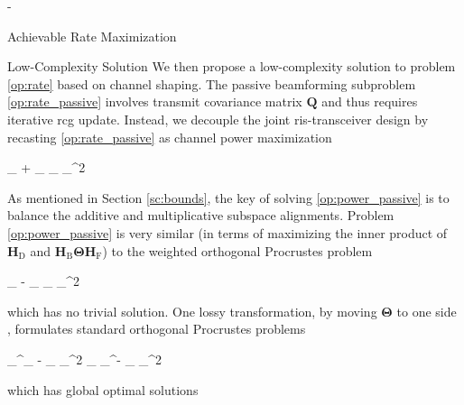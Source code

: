\begin{section}{-}
\begin{subsection}{Achievable Rate Maximization}
		\begin{subsubsection}{Low-Complexity Solution}\label{sc:low_complexity}
			We then propose a low-complexity solution to problem \eqref{op:rate} based on channel shaping.
			The passive beamforming subproblem \eqref{op:rate_passive} involves transmit covariance matrix $\mathbf{Q}$ and thus requires iterative \gls{rcg} update.
			Instead, we decouple the joint \gls{ris}-transceiver design by recasting \eqref{op:rate_passive} as channel power maximization
			\begin{maxi!}
				{\scriptstyle{\mathbf{\Theta}}}{\lVert {}_ + _ \mathbf{\Theta} _\mathrm{F} \rVert _^2}{\label{op:power_passive}}{\label{ob:power_passive}}
			\end{maxi!}
			\begin{remark}
				As mentioned in Section \ref{sc:bounds}, the key of solving \eqref{op:power_passive} is to balance the additive and multiplicative subspace alignments.
				Problem \eqref{op:power_passive} is very similar (in terms of maximizing the inner product of $\mathbf{H}_\mathrm{D}$ and $\mathbf{H}_\mathrm{B} \mathbf{\Theta} \mathbf{H}_\mathrm{F}$) to the weighted orthogonal Procrustes problem \cite{Gower2004}
				\begin{mini!}
					{\scriptstyle{\mathbf{\Theta}}}{\lVert \mathbf{H}_ - _ \mathbf{\Theta} _\mathrm{F} \rVert _^2}{\label{op:weighted_orthogonal_procrustes}}{}
				\end{mini!}
				which has no trivial solution.
				One lossy transformation, by moving $\mathbf{\Theta}$ to one side \cite{Bell2003}, formulates standard orthogonal Procrustes problems
				\begin{mini!}
					{\scriptstyle{\mathbf{\Theta}}}{\lVert {}_^\dagger {}_ - \mathbf{\Theta} _\mathrm{F} \rVert _^2  \lVert \mathbf{H}_ _^\dagger - _ \mathbf{\Theta} \rVert _^2}{\label{op:standard_orthogonal_procrustes}}{}
					\addConstraint{\mathbf{\Theta}^\mathsf{H} \mathbf{\Theta}=\mathbf{I},}{}{}
				\end{mini!}
				which has global optimal solutions
				\begin{equation}

\end{equation}
\end{remark}
\end{subsubsection}
\end{subsection}
\end{section}
